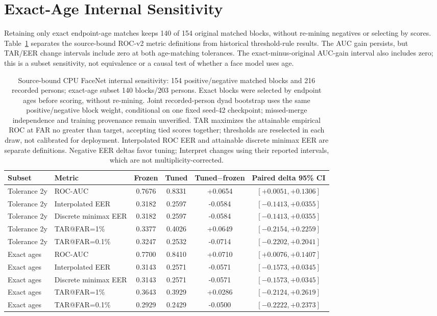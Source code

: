 \documentclass[journal]{IEEEtran}
\begin{document}
\section{Exact-Age Internal Sensitivity}\label{sec:internal-roc-v2}
Retaining only exact endpoint-age matches keeps 140 of 154 original matched blocks, without
re-mining negatives or selecting by scores. Table~\ref{tab:internal-roc-v2} separates the
source-bound ROC-v2 metric definitions from historical threshold-rule results. The AUC gain
persists, but TAR/EER change intervals include zero at both age-matching tolerances. The
exact-minus-original AUC-gain interval also includes zero; this is a subset sensitivity,
not equivalence or a causal test of whether a face model uses age.

\begin{table}[!t]
\caption{Source-bound CPU FaceNet internal sensitivity: 154 positive/negative matched blocks and 216 recorded persons; exact-age subset 140 blocks/203 persons. Exact blocks were selected by endpoint ages before scoring, without re-mining. Joint recorded-person dyad bootstrap uses the same positive/negative block weight, conditional on one fixed seed-42 checkpoint; missed-merge independence and training provenance remain unverified. TAR maximizes the attainable empirical ROC at FAR no greater than target, accepting tied scores together; thresholds are reselected in each draw, not calibrated for deployment. Interpolated ROC EER and attainable discrete minimax EER are separate definitions. Negative EER deltas favor tuning; Interpret changes using their reported intervals, which are not multiplicity-corrected.}
\label{tab:internal-roc-v2}
\centering\footnotesize
\begin{tabular}{@{}llcccc@{}}
\toprule
Subset & Metric & Frozen & Tuned & Tuned$-$frozen & Paired delta 95\% CI \\
\midrule
Tolerance 2y & ROC-AUC & 0.7676 & 0.8331 & +0.0654 & $[+0.0051,+0.1306]$ \\
Tolerance 2y & Interpolated EER & 0.3182 & 0.2597 & -0.0584 & $[-0.1413,+0.0355]$ \\
Tolerance 2y & Discrete minimax EER & 0.3182 & 0.2597 & -0.0584 & $[-0.1413,+0.0355]$ \\
Tolerance 2y & TAR@FAR=1\% & 0.3377 & 0.4026 & +0.0649 & $[-0.2154,+0.2259]$ \\
Tolerance 2y & TAR@FAR=0.1\% & 0.3247 & 0.2532 & -0.0714 & $[-0.2202,+0.2041]$ \\
Exact ages & ROC-AUC & 0.7700 & 0.8410 & +0.0710 & $[+0.0076,+0.1407]$ \\
Exact ages & Interpolated EER & 0.3143 & 0.2571 & -0.0571 & $[-0.1573,+0.0345]$ \\
Exact ages & Discrete minimax EER & 0.3143 & 0.2571 & -0.0571 & $[-0.1573,+0.0345]$ \\
Exact ages & TAR@FAR=1\% & 0.3643 & 0.3929 & +0.0286 & $[-0.2124,+0.2619]$ \\
Exact ages & TAR@FAR=0.1\% & 0.2929 & 0.2429 & -0.0500 & $[-0.2222,+0.2373]$ \\
\bottomrule
\end{tabular}
\end{table}
\end{document}

